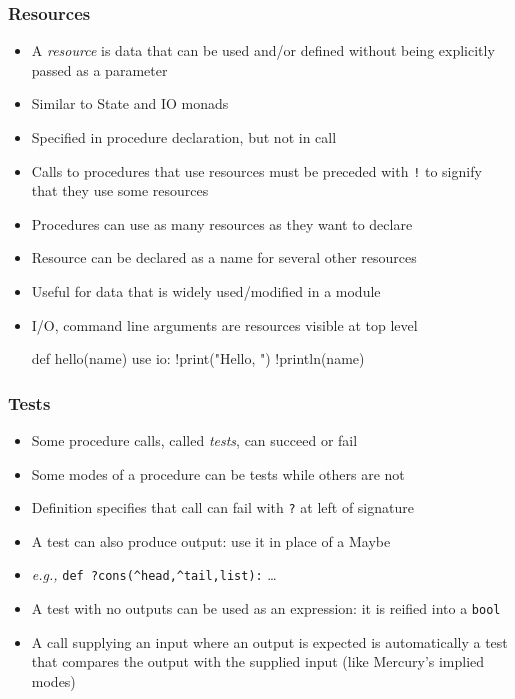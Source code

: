 \documentclass[12pt]{beamer}
\begin{document}
\begin{frame}[fragile]
\frametitle{Resources}
\begin{itemize}
\item A \emph{resource} is data that can be used and/or defined
  without being explicitly passed as a parameter
\item Similar to State and IO monads
\item Specified in procedure declaration, but not in call
\item Calls to procedures that use resources must be preceded with
  \texttt{!} to signify that they use some resources
\item Procedures can use as many resources as they want to declare
\item Resource can be declared as a name for several other resources
\item Useful for data that is widely used/modified in a module
\item I/O, command line arguments are resources visible at top level
  \begin{semiverbatim}
def hello(name) use io:
    !print("Hello, ")
    !println(name)
  \end{semiverbatim}
\end{itemize}
\end{frame}


\begin{frame}[fragile]
\frametitle{Tests}
\begin{itemize}
\item Some procedure calls, called \emph{tests}, can succeed or fail
\item Some modes of a procedure can be tests while others are not
\item Definition specifies that call can fail with \texttt{?} at left
  of signature
\item A test can also produce output: use it in place of a Maybe
\item \emph{e.g.,} \texttt{def ?cons(\^{ }head,\^{ }tail,list):} \ldots
\item A test with no outputs can be used as an expression:  it is
  reified into a \texttt{bool}
\item A call supplying an input where an output is expected is
  automatically a test that compares the output with the supplied input
(like Mercury's implied modes)
\end{itemize}
\end{frame}
\end{document}
